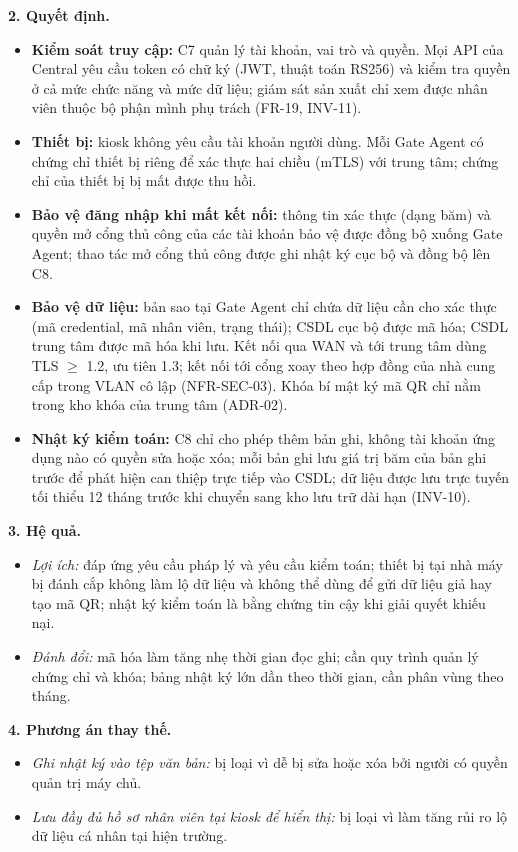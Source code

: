 \noindent\textbf{2. Quyết định.}
\begin{itemize}
    \item \textbf{Kiểm soát truy cập:} C7 quản lý tài khoản, vai trò và quyền. Mọi API của Central yêu cầu token có chữ ký (JWT, thuật toán RS256) và kiểm tra quyền ở cả mức chức năng và mức dữ liệu; giám sát sản xuất chỉ xem được nhân viên thuộc bộ phận mình phụ trách (FR-19, INV-11).
    \item \textbf{Thiết bị:} kiosk không yêu cầu tài khoản người dùng. Mỗi Gate Agent có chứng chỉ thiết bị riêng để xác thực hai chiều (mTLS) với trung tâm; chứng chỉ của thiết bị bị mất được thu hồi.
    \item \textbf{Bảo vệ đăng nhập khi mất kết nối:} thông tin xác thực (dạng băm) và quyền mở cổng thủ công của các tài khoản bảo vệ được đồng bộ xuống Gate Agent; thao tác mở cổng thủ công được ghi nhật ký cục bộ và đồng bộ lên C8.
    \item \textbf{Bảo vệ dữ liệu:} bản sao tại Gate Agent chỉ chứa dữ liệu cần cho xác thực (mã credential, mã nhân viên, trạng thái); CSDL cục bộ được mã hóa; CSDL trung tâm được mã hóa khi lưu. Kết nối qua WAN và tới trung tâm dùng TLS $\ge$ 1.2, ưu tiên 1.3; kết nối tới cổng xoay theo hợp đồng của nhà cung cấp trong VLAN cô lập (NFR-SEC-03). Khóa bí mật ký mã QR chỉ nằm trong kho khóa của trung tâm (ADR-02).
    \item \textbf{Nhật ký kiểm toán:} C8 chỉ cho phép thêm bản ghi, không tài khoản ứng dụng nào có quyền sửa hoặc xóa; mỗi bản ghi lưu giá trị băm của bản ghi trước để phát hiện can thiệp trực tiếp vào CSDL; dữ liệu được lưu trực tuyến tối thiểu 12 tháng trước khi chuyển sang kho lưu trữ dài hạn (INV-10).
\end{itemize}

\noindent\textbf{3. Hệ quả.}
\begin{itemize}
    \item \textit{Lợi ích:} đáp ứng yêu cầu pháp lý và yêu cầu kiểm toán; thiết bị tại nhà máy bị đánh cắp không làm lộ dữ liệu và không thể dùng để gửi dữ liệu giả hay tạo mã QR; nhật ký kiểm toán là bằng chứng tin cậy khi giải quyết khiếu nại.
    \item \textit{Đánh đổi:} mã hóa làm tăng nhẹ thời gian đọc ghi; cần quy trình quản lý chứng chỉ và khóa; bảng nhật ký lớn dần theo thời gian, cần phân vùng theo tháng.
\end{itemize}

\noindent\textbf{4. Phương án thay thế.}
\begin{itemize}
    \item \textit{Ghi nhật ký vào tệp văn bản:} bị loại vì dễ bị sửa hoặc xóa bởi người có quyền quản trị máy chủ.
    \item \textit{Lưu đầy đủ hồ sơ nhân viên tại kiosk để hiển thị:} bị loại vì làm tăng rủi ro lộ dữ liệu cá nhân tại hiện trường.
\end{itemize}

